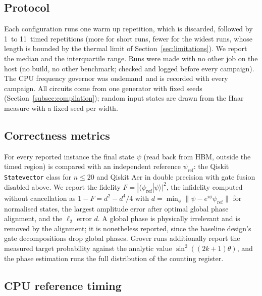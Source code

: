 \documentclass[pdflatex,sn-mathphys-num]{sn-jnl}
\newcommand{\NumGovernor}{ondemand}
\newcommand{\NumRefSvMax}{20}
\newcommand{\NumRepsMax}{11}
\newcommand{\NumRepsMin}{1}
\theoremstyle{thmstyleone}
\theoremstyle{thmstylethree}
\begin{document}
\subsection{Protocol}\label{subsec:protocol}

Each configuration runs one warm up repetition, which is discarded, followed by \NumRepsMin\ to \NumRepsMax~timed
repetitions (more for short runs, fewer for the widest runs, whose length is bounded by the thermal limit of
Section~\ref{sec:limitations}). We report the median and the interquartile range.
Runs were made with no other job on the host (no build, no other benchmark; checked and logged before every campaign).
The CPU frequency governor was \NumGovernor\ and is recorded with every campaign. All circuits come from one
generator with fixed seeds (Section~\ref{subsec:compilation}); random input states are drawn from the Haar measure with
a fixed seed per width.

\subsection{Correctness metrics}\label{subsec:metrics}

For every reported instance the final state $\psi$ (read back from HBM, outside the timed region) is compared with
an independent reference $\psi_{\mathrm{ref}}$: the Qiskit \texttt{Statevector} class for $n \le \NumRefSvMax$ and Qiskit
Aer in double precision with gate fusion disabled above. We report the fidelity
$F = |\langle \psi_{\mathrm{ref}} | \psi \rangle|^2$, the infidelity computed without cancellation as
$1 - F = d^2 - d^4/4$ with $d = \min_\phi \lVert \psi - e^{i\phi} \psi_{\mathrm{ref}} \rVert$ for normalised states, the
largest amplitude error after optimal global phase alignment, and the $\ell_2$ error $d$. A global phase is
physically irrelevant and is removed by the alignment; it is nonetheless reported, since the baseline design's gate
decompositions drop global phases. Grover runs additionally report the measured target probability against the
analytic value $\sin^2((2k+1)\theta)$, and the phase estimation runs the full distribution of the counting register.

\subsection{CPU reference timing}\label{subsec:method-cpu}
\end{document}
